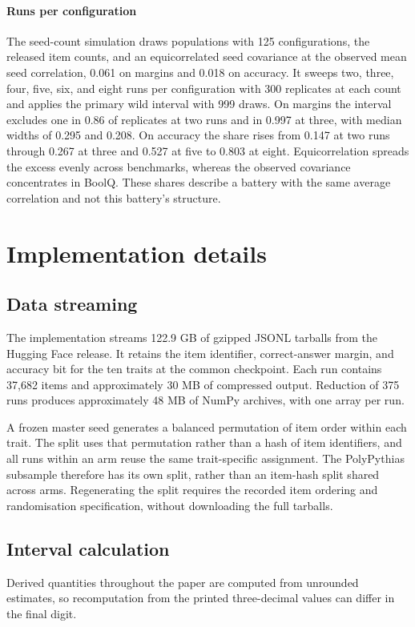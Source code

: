 \paragraph{Runs per configuration}
The seed-count simulation draws populations with 125 configurations, the released item counts, and an equicorrelated seed covariance at the observed mean seed correlation, 0.061 on margins and 0.018 on accuracy. It sweeps two, three, four, five, six, and eight runs per configuration with 300 replicates at each count and applies the primary wild interval with 999 draws. On margins the interval excludes one in 0.86 of replicates at two runs and in 0.997 at three, with median widths of 0.295 and 0.208. On accuracy the share rises from 0.147 at two runs through 0.267 at three and 0.527 at five to 0.803 at eight. Equicorrelation spreads the excess evenly across benchmarks, whereas the observed covariance concentrates in BoolQ. These shares describe a battery with the same average correlation and not this battery's structure.

\section{Implementation details}
\label{app:implementation}

\subsection{Data streaming}
The implementation streams 122.9 GB of gzipped JSONL tarballs from the Hugging Face release. It retains the item identifier, correct-answer margin, and accuracy bit for the ten traits at the common checkpoint. Each run contains 37,682 items and approximately 30 MB of compressed output. Reduction of 375 runs produces approximately 48 MB of NumPy archives, with one array per run.

A frozen master seed generates a balanced permutation of item order within each trait. The split uses that permutation rather than a hash of item identifiers, and all runs within an arm reuse the same trait-specific assignment. The PolyPythias subsample therefore has its own split, rather than an item-hash split shared across arms. Regenerating the split requires the recorded item ordering and randomisation specification, without downloading the full tarballs.

\subsection{Interval calculation}
Derived quantities throughout the paper are computed from unrounded estimates, so recomputation from the printed three-decimal values can differ in the final digit.

